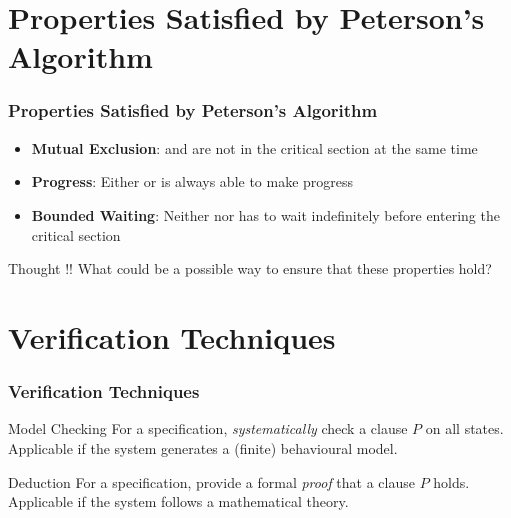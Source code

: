 \documentclass[xcolor=dvipsnames]{beamer}
\begin{document}
\section{Properties Satisfied by Peterson's Algorithm}
\begin{frame}
	\frametitle{Properties Satisfied by Peterson's Algorithm}
	\begin{itemize}
		\item \textbf{Mutual Exclusion}: \pa and \pb are not in the critical section at the same time
		\item \textbf{Progress}: Either \pa or \pb is always able to make progress
		\item \textbf{Bounded Waiting}: Neither \pa nor \pb has to wait indefinitely before entering the critical section\footnotemark
	\end{itemize}
	\begin{block}{Thought !! }
		What could be a possible way to ensure that these properties hold?
	\end{block}
	
\end{frame}


\section{Verification Techniques}
\begin{frame}
	\frametitle{Verification Techniques}
	\begin{block}{Model Checking}
			For a specification, \emph{systematically} check a clause $P$ on all states. \\ Applicable if the system generates a (finite) behavioural model.
	\end{block}
\begin{block}{Deduction}
	For a specification, provide a formal \emph{proof} that a clause $P$ holds. \\
	Applicable if the system follows a mathematical theory.
	\end{block}
\end{frame}
\end{document}
